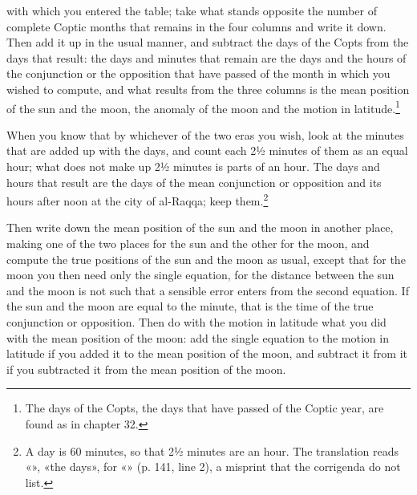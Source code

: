 \documentclass[11pt]{article}
\newcommand{\ArPage}[1]{\marginpar{\footnotesize\color{gray}Ar.\,p.\,#1}}
\begin{document}
with which you entered the table; take what stands opposite the number of complete Coptic months that remains in the four columns and write it down. Then add it up in the usual manner, and subtract the days of the Copts from the days that result: the days and minutes that remain are the days and the hours of the conjunction or the opposition that have passed of the month in which you wished to compute, and what results from the three columns is the mean position of the sun and the moon, the anomaly of the moon and the motion in latitude.\footnote{The days of the Copts, the days that have passed of the Coptic year, are found as in chapter 32.}\par
\par \ArPage{141}When you know that by whichever of the two eras you wish, look at the minutes that are added up with the days, and count each 2½ minutes of them as an equal hour; what does not make up 2½ minutes is parts of an hour. The days and hours that result are the days of the mean conjunction or opposition and its hours after noon at the city of al-Raqqa; keep them.\footnote{A day is 60 minutes, so that 2½ minutes are an hour. The translation reads «», «the days», for «» (p. 141, line 2), a misprint that the corrigenda do not list.}\par
\par Then write down the mean position of the sun and the moon in another place, making one of the two places for the sun and the other for the moon, and compute the true positions of the sun and the moon as usual, except that for the moon you then need only the single equation, for the distance between the sun and the moon is not such that a sensible error enters from the second equation. If the sun and the moon are equal to the minute, that is the time of the true conjunction or opposition. Then do with the motion in latitude what you did with the mean position of the moon: add the single equation to the motion in latitude if you added it to the mean position of the moon, and subtract it from it if you subtracted it from the mean position of the moon.\par
\end{document}
